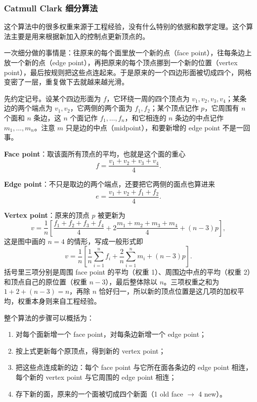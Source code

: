 \subsubsection{Catmull Clark 细分算法}

这个算法中的很多权重来源于工程经验，没有什么特别的依据和数学定理。这个算法主要是用来根据新加入的控制点更新顶点的。

一次细分做的事情是：往原来的每个面里放一个新的点（face point），往每条边上放一个新的点（edge point），再把原来的每个顶点挪到一个新的位置（vertex point），最后按规则把这些点连起来。于是原来的一个四边形面被切成四个，网格变密了一层，重复做下去就越来越光滑。

先约定记号。设某个四边形面为 $f$，它环绕一周的四个顶点为 $v_1, v_2, v_3, v_4$；某条边的两个端点为 $v_1, v_2$，它两侧的两个面为 $f_1, f_2$；某个顶点记作 $p$，它周围有 $n$ 个面和 $n$ 条边，这 $n$ 个面记作 $f_1, \ldots, f_n$，和它相连的 $n$ 条边的中点记作 $m_1, \ldots, m_n$。注意 $m$ 只是边的中点（midpoint），和要新增的 edge point 不是一回事。

\textbf{Face point}：取该面所有顶点的平均，也就是这个面的重心
\[
f = \frac{v_1 + v_2 + v_3 + v_4}{4}.
\]

\textbf{Edge point}：不只是取边的两个端点，还要把它两侧的面点也算进来
\[
e = \frac{v_1 + v_2 + f_1 + f_2}{4}.
\]

\textbf{Vertex point}：原来的顶点 $p$ 被更新为
\[
v = \frac{1}{n}\left[\frac{f_1 + f_2 + f_3 + f_4}{4} + 2\frac{m_1 + m_2 + m_3 + m_4}{4} + (n-3)p\right],
\]
这是图中画的 $n = 4$ 的情形，写成一般形式即
\[
v = \frac{1}{n}\left[\frac{1}{n}\sum_{i=1}^{n} f_i + \frac{2}{n}\sum_{i=1}^{n} m_i + (n-3)p\right].
\]
括号里三项分别是周围 face point 的平均（权重 1）、周围边中点的平均（权重 2）和顶点自己的原位置（权重 $n-3$），最后整体除以 $n$。三项权重之和为 $1 + 2 + (n-3) = n$，再除 $n$ 恰好归一，所以新的顶点位置是这几项的加权平均，权重本身则来自工程经验。

整个算法的步骤可以概括为：

\begin{enumerate}[nosep]
    \item 对每个面新增一个 face point，对每条边新增一个 edge point；
    \item 按上式更新每个原顶点，得到新的 vertex point；
    \item 把这些点连成新的边：每个 face point 与它所在面各条边的 edge point 相连，每个新的 vertex point 与它周围的 edge point 相连；
    \item 存下新的面，原来的一个面被切成四个新面（1 old face $\rightarrow$ 4 new）。
\end{enumerate}


